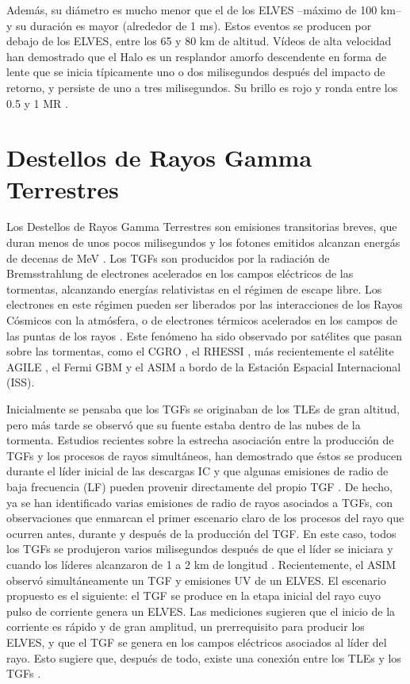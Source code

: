 \documentclass[12pt,oneside,openany,letter]{book}
\begin{document}
Además, su diámetro es mucho menor que el de los ELVES --máximo de 100 km-- y su duración es mayor (alrededor de 1 ms). Estos eventos se producen por debajo de los ELVES, entre los 65 y 80 km de altitud. Vídeos de alta velocidad \cite{ArmstrongLyons2000, StanleyEtal1999, StenbaekEtal2000} han demostrado que el Halo es un resplandor amorfo descendente en forma de lente que se inicia típicamente uno o dos milisegundos después del impacto de retorno, y persiste de uno a tres milisegundos. Su brillo es rojo y ronda entre los 0.5 y 1 MR \cite{FullekrugEtal2006}.

\section{Destellos de Rayos Gamma Terrestres}
Los Destellos de Rayos Gamma Terrestres son emisiones transitorias breves, que duran menos de unos pocos milisegundos y los fotones emitidos alcanzan energ\'as de decenas de MeV \cite{neubertEtal2020}. Los TGFs son producidos por la radiación de Bremsstrahlung de electrones acelerados en los campos eléctricos de las tormentas, alcanzando energías relativistas en el régimen de escape libre. Los electrones en este régimen pueden ser liberados por las interacciones de los Rayos Cósmicos con la atmósfera, o de electrones térmicos acelerados en los campos de las puntas de los rayos \cite{neubertEtal2020}. Este fenómeno ha sido observado por sat\'elites que pasan sobre las tormentas, como el CGRO \cite{FishmanEtal1994}, el RHESSI \cite{Smith2005Etal}, m\'as recientemente el sat\'elite AGILE \cite{MarisaldiEtal2010}, el Fermi GBM \cite{RobertsEtal2018} y el ASIM \cite{neubertEtal2019} a bordo de la Estaci\'on Espacial Internacional (ISS).

Inicialmente se pensaba que los TGFs se originaban de los TLEs de gran altitud, pero más tarde se observó que su fuente estaba dentro de las nubes de la tormenta. Estudios recientes sobre la estrecha asociación entre la producción de TGFs y los procesos de rayos simultáneos, han demostrado que \'estos se producen durante el líder inicial de las descargas IC y que algunas emisiones de radio de baja frecuencia (LF) pueden provenir directamente del propio TGF \cite{LyuEtal2018}. De hecho, ya se han identificado varias emisiones de radio de rayos asociados a TGFs, con observaciones que enmarcan el primer escenario claro de los procesos del rayo que ocurren antes, durante y después de la producción del TGF. En este caso, todos los TGFs se produjeron varios milisegundos después de que el líder se iniciara y cuando los líderes alcanzaron de 1 a 2 km de longitud \cite{CummerEtal2015}. Recientemente, el ASIM observ\'o simultáneamente un TGF y emisiones UV de un ELVES. El escenario propuesto es el siguiente: el TGF se produce en la etapa inicial del rayo cuyo pulso de corriente genera un ELVES. Las mediciones sugieren que el inicio de la corriente es rápido y de gran amplitud, un prerrequisito para producir los ELVES, y que el TGF se genera en los campos eléctricos asociados al líder del rayo. Esto sugiere que, después de todo, existe una conexión entre los TLEs y los TGFs \cite{neubertEtal2020}. 
\end{document}
